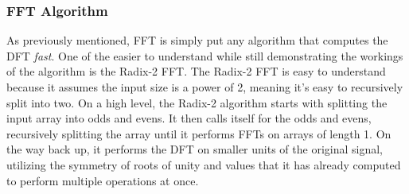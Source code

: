 







\subsubsection{FFT Algorithm}
As previously mentioned, FFT is simply put any algorithm that computes the DFT \textit{fast}. One of the easier to understand while still demonstrating the workings of the algorithm is the Radix-2 FFT. The Radix-2 FFT is easy to understand because it assumes the input size is a power of 2, meaning it's easy to recursively split into two. On a high level, the Radix-2 algorithm starts with splitting the input array into odds and evens. It then calls itself for the odds and evens, recursively splitting the array until it performs FFTs on arrays of length 1. On the way back up, it performs the DFT on smaller units of the original signal, utilizing the symmetry of roots of unity and values that it has already computed to perform multiple operations at once. 

